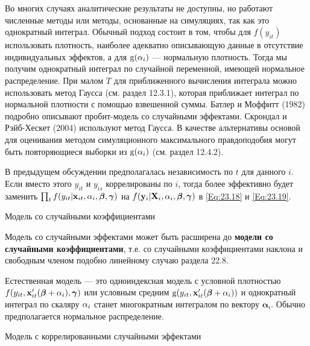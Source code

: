 Во многих случаях аналитические результаты не доступны, но работают численные методы или методы, основанные на симуляциях, так как это однократный интеграл. Обычный подход состоит в том, чтобы для $f(y_{it})$ использовать плотность, наиболее адекватно описывающую данные  в отсутствие индивидуальных эффектов, а для $\mathrm g(\alpha_i)$ --- нормальную плотность. Тогда мы получим однократный интеграл по случайной переменной, имеющей нормальное распределение. При малом $T$ для приближенного вычисления интеграла можно использовать метод Гаусса (см. раздел 12.3.1), которая приближает интеграл по нормальной плотности с помощью взвешенной суммы. Батлер и Моффитт (1982) подробно описывают пробит-модель со случайными эффектами. Скрондал и Рэйб-Хескет (2004) используют метод Гаусса. В качестве альтернативы основой для оценивания методом симуляционного максимального правдоподобия могут быть  повторяющиеся выборки из $\mathrm g(\alpha_i)$ (см. раздел 12.4.2).

В предыдущем обсуждении предполагалась независимость по $t$ для данного $i$. Если вместо этого $y_{it}$ и $y_{is}$ коррелированы по $i$, тогда более эффективно будет заменить $\prod_t f(y_{it}|\mathbf{x}_{it}, \alpha_i, \bm{\beta}, \bm\gamma)$ на $ f(\mathbf{y}_i|\mathbf{X}_i, \alpha_i, \bm{\beta}, \bm\gamma)$ в \ref{Eq:23.18} и \ref{Eq:23.19}.

{\centering Модель со случайными коэффициентами \\}

Модель со случайными эффектами может быть расширена до \textbf{модели со случайными коэффициентами}, т.е. со случайными коэффициентами наклона и свободным членом подобно линейному случаю раздела 22.8.

Естественная модель --- это одноиндексная модель с условной плотностью $f(y_{it}, \mathbf{x}'_{it}(\bm{\beta}+\alpha_i),\bm\gamma)$ или условным средним $\mathrm g(y_{it}, \mathbf{x}'_{it}(\bm{\beta}+\alpha_i))$ и однократный интеграл по скаляру $\alpha_i$  станет многократным интегралом по вектору $\bm\alpha_i$. Обычно предполагается нормальное распределение.

{\centering Модель с коррелированными случайными эффектами \\}
  

